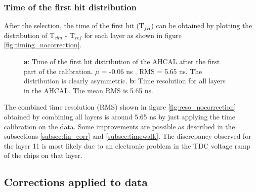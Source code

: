 \documentclass[twoside,a4paper,11pt]{article}
\begin{document}
\subsubsection{Time of the first hit distribution}
After the selection, the time of the first hit (T$_{fH}$) can be obtained by plotting the distribution of T$_{chn}$ - T$_{ref}$ for each layer as shown in figure \ref{fig:timing_nocorrection}.
\begin{figure}[htbp]
	\hfill
	\hfill
\caption[]{\textbf{a}: Time of the first hit distribution of the AHCAL after the first part of the calibration. $\mu$ = -0.06 ns , RMS = 5.65 ns. The distribution is clearly asymmetric. \textbf{b}: Time resolution for all layers in the AHCAL. The mean RMS is 5.65 ns.}
\end{figure}
The combined time resolution (RMS) shown in figure \ref{fig:reso_nocorrection} obtained by combining all layers is around 5.65 ns by just applying the time calibration on the data. Some improvements are possible as described in the subsections \ref{subsec:lin_corr} and \ref{subsec:timewalk}. The discrepancy observed for the layer 11 is most likely due to an electronic problem in the TDC voltage ramp of the chips on that layer.

\subsection{Corrections applied to data}
\end{document}
